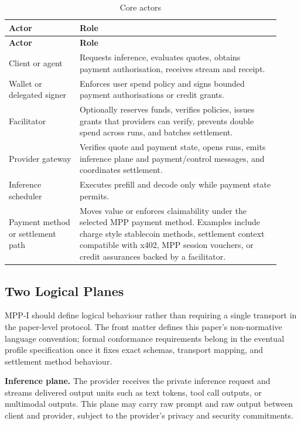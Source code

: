 \documentclass[11pt]{article}
\newcommand{\mppi}{MPP-I}
\begin{document}
\begin{longtable}{>{\raggedright\arraybackslash}p{0.24\linewidth} >{\raggedright\arraybackslash}p{0.68\linewidth}}
\caption{Core actors}\label{tab:core-actors}\\
\toprule
\textbf{Actor} & \textbf{Role} \\
\midrule
\endfirsthead
\toprule
\textbf{Actor} & \textbf{Role} \\
\midrule
\endhead
Client or agent & Requests inference, evaluates quotes, obtains payment authorisation, receives stream and receipt. \\
Wallet or delegated signer & Enforces user spend policy and signs bounded payment authorisations or credit grants. \\
Facilitator & Optionally reserves funds, verifies policies, issues grants that providers can verify, prevents double spend across runs, and batches settlement. \\
Provider gateway & Verifies quote and payment state, opens runs, emits inference plane and payment/control messages, and coordinates settlement. \\
Inference scheduler & Executes prefill and decode only while payment state permits. \\
Payment method or settlement path & Moves value or enforces claimability under the selected MPP payment method. Examples include charge style stablecoin methods, settlement context compatible with x402, MPP session vouchers, or credit assurances backed by a facilitator. \\
\bottomrule
\end{longtable}

\subsection{Two Logical Planes}

\mppi{} should define logical behaviour rather than requiring a single transport in the paper-level protocol. The front matter defines this paper's non-normative language convention; formal conformance requirements belong in the eventual profile specification once it fixes exact schemas, transport mapping, and settlement method behaviour.

\textbf{Inference plane.} The provider receives the private inference request and streams delivered output units such as text tokens, tool call outputs, or multimodal outputs. This plane may carry raw prompt and raw output between client and provider, subject to the provider's privacy and security commitments.
\end{document}
